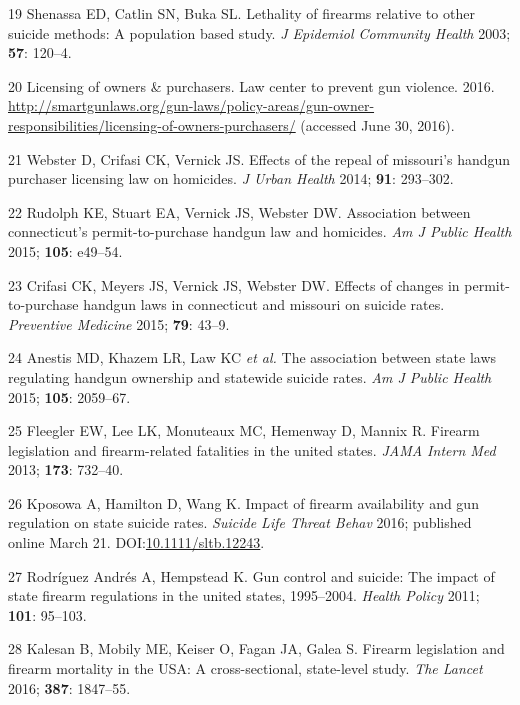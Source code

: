 \documentclass[]{article}
\begin{document}
\hypertarget{ref-shenassaux5flethalityux5f2003}{}
19 Shenassa ED, Catlin SN, Buka SL. Lethality of firearms relative to
other suicide methods: A population based study. \emph{J Epidemiol
Community Health} 2003; \textbf{57}: 120--4.

\hypertarget{ref-ux5flicensingux5f2016}{}
20 Licensing of owners \& purchasers. Law center to prevent gun
violence. 2016.
\url{http://smartgunlaws.org/gun-laws/policy-areas/gun-owner-responsibilities/licensing-of-owners-purchasers/}
(accessed June 30, 2016).

\hypertarget{ref-websterux5feffectsux5f2014}{}
21 Webster D, Crifasi CK, Vernick JS. Effects of the repeal of
missouri's handgun purchaser licensing law on homicides. \emph{J Urban
Health} 2014; \textbf{91}: 293--302.

\hypertarget{ref-rudolphux5fassociationux5f2015}{}
22 Rudolph KE, Stuart EA, Vernick JS, Webster DW. Association between
connecticut's permit-to-purchase handgun law and homicides. \emph{Am J
Public Health} 2015; \textbf{105}: e49--54.

\hypertarget{ref-crifasiux5feffectsux5f2015}{}
23 Crifasi CK, Meyers JS, Vernick JS, Webster DW. Effects of changes in
permit-to-purchase handgun laws in connecticut and missouri on suicide
rates. \emph{Preventive Medicine} 2015; \textbf{79}: 43--9.

\hypertarget{ref-anestisux5fassociationux5f2015}{}
24 Anestis MD, Khazem LR, Law KC \emph{et al.} The association between
state laws regulating handgun ownership and statewide suicide rates.
\emph{Am J Public Health} 2015; \textbf{105}: 2059--67.

\hypertarget{ref-fleeglerux5fewux5ffirearmux5f2013}{}
25 Fleegler EW, Lee LK, Monuteaux MC, Hemenway D, Mannix R. Firearm
legislation and firearm-related fatalities in the united states.
\emph{JAMA Intern Med} 2013; \textbf{173}: 732--40.

\hypertarget{ref-kposowaux5fimpactux5f2016}{}
26 Kposowa A, Hamilton D, Wang K. Impact of firearm availability and gun
regulation on state suicide rates. \emph{Suicide Life Threat Behav}
2016; published online March 21.
DOI:\href{https://doi.org/10.1111/sltb.12243}{10.1111/sltb.12243}.

\hypertarget{ref-rodriguezux5fandresux5fgunux5f2011}{}
27 Rodríguez Andrés A, Hempstead K. Gun control and suicide: The impact
of state firearm regulations in the united states, 1995--2004.
\emph{Health Policy} 2011; \textbf{101}: 95--103.

\hypertarget{ref-kalesanux5ffirearmux5f2016}{}
28 Kalesan B, Mobily ME, Keiser O, Fagan JA, Galea S. Firearm
legislation and firearm mortality in the USA: A cross-sectional,
state-level study. \emph{The Lancet} 2016; \textbf{387}: 1847--55.
\end{document}
